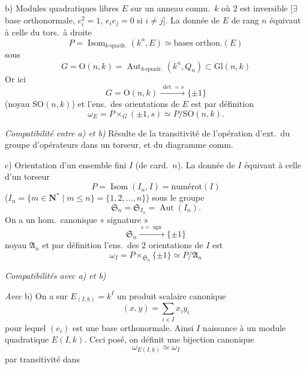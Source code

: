 \documentclass[11pt,a4paper]{article}
\begin{document}
b) Modules quadratiques libres \struck{\ill{}} $E$ sur un anneau comm.\ $k$ où
$2$ est inversible [$\exists$ base orthonormale, \struck{\ill{}} $e_i^2 = 1$,
$e_i e_j = 0$ si $i \neq j$]. La donnée de $E$ de rang $n$ équivaut à celle du
tors.\ à droite
\[
  P = \operatorname{Isom}_{k\text{-quadr.}}(k^n, E) \simeq \text{bases orthon.}(E)
\]
sous
\[
  G = \mathrm{O}(n, k) = \operatorname{Aut}_{k\text{-quadr.}}(k^n, Q_n)
  \subset \mathrm{Gl}(n, k)
\]
Or ici
\[
  G = \mathrm{O}(n, k) \xrightarrow{\ \det = s\ } \{\pm 1\}
\]
(noyau $\mathrm{SO}(n, k)$)
et l'ens.\ des orientations de $E$ est par définition
\[
  \omega_E = P \times_G (\pm 1, s) \simeq P / \mathrm{SO}(n, k).
\]

\textit{Compatibilité entre a) et b)} Résulte de la transitivité de l'opération
d'ext.\ du groupe d'opérateurs dans un torseur, et du diagramme comm.


c) Orientation d'un ensemble fini $I$ (de card.\ $n$). La donnée de $I$
équivaut à celle d'un torseur
\[
  P = \operatorname{Isom}(I_n, I) = \text{numérot}(I)
\]
($I_n = \{ m \in \mathbf{N}^* \mid m \leq n \} = \{1, 2, \ldots, n\}$) sous le
groupe
\[
  \mathfrak{S}_n = \mathfrak{S}_{I_n} = \operatorname{Aut}(I_n).
\]
On a un hom.\ canonique « signature »
\[
  \mathfrak{S}_n \xrightarrow{\ s = \operatorname{sgn}\ } \{\pm 1\}
\]
noyau $\mathfrak{A}_n$
et par définition l'ens.\ des $2$ orientations de $I$ est
\[
  \omega_I = P \times_{\mathfrak{S}_n} \{\pm 1\} \simeq P / \mathfrak{A}_n
\]

\textit{Compatibilités avec a) et b)}

\textit{Avec} b) On a sur $E_{(I,k)} = k^I$ un produit scalaire canonique
\[
  (x, y) = \sum_{i \in I} x_i y_i
\]
pour lequel $(e_i)$ est une base orthonormale. Ainsi $I$ \struck{\ill{}}
 naissance à un module quadratique $E(I, k)$. Ceci posé, on
définit une bijection canonique
\[
  \omega_{E(I,k)} \simeq \omega_I
\]
par transitivité dans
\end{document}
